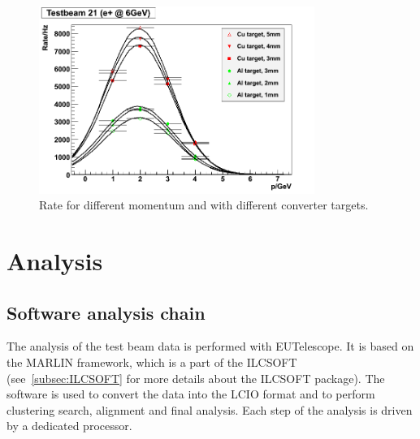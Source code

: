     \begin{figure}[!h]
      \centering
      \includegraphics[width = 0.8\textwidth]{Pictures/X0/rate_vs_p_t21.png}
      \caption{Rate for different momentum and with different converter targets\cite{DESYII}.}
      \label{fig:rateTB21}
    \end{figure}


  \section{Analysis}
  \label{sec:X0}

   \subsection{Software analysis chain}

    The analysis of the test beam data is performed with EUTelescope\cite{Eutel}\cite{Jansen}.
    It is based on the MARLIN framework, which is a part of the ILCSOFT (see~\ref{subsec:ILCSOFT} for more details about the ILCSOFT package).
    The software is used to convert the data into the LCIO format and to perform clustering search, alignment and final analysis.
    Each step of the analysis is driven by a dedicated processor.
    
